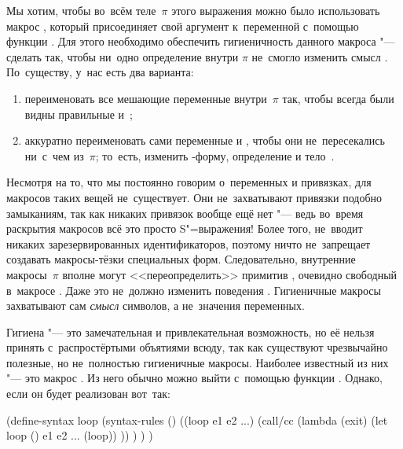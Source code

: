 Мы хотим, чтобы во~всём теле~$\pi$ этого выражения можно было использовать
макрос , который присоединяет свой аргумент к~переменной 
с~помощью функции . Для этого необходимо обеспечить гигиеничность
данного макроса "--- сделать так, чтобы ни~одно определение внутри $\pi$ не~смогло
изменить смысл . По~существу, у~нас есть два варианта:

\begin{enumerate}
  \item переименовать все мешающие переменные внутри~$\pi$ так, чтобы
        всегда были видны правильные  и~;

  \item аккуратно переименовать сами переменные  и ,
        чтобы они не~пересекались ни~с~чем из~$\pi$; то~есть, изменить
        -форму, определение  и тело~.
\end{enumerate}

Несмотря на то, что мы постоянно говорим о~переменных и привязках, для макросов
таких вещей не~существует. Они не~захватывают привязки подобно замыканиям, так
как никаких привязок вообще ещё нет "--- ведь во~время раскрытия макросов всё
это просто S"=выражения! Более того, {\RnRS} не~вводит никаких зарезервированных
идентификаторов, поэтому ничто не~запрещает создавать макросы-тёзки специальных
форм. Следовательно, внутренние макросы~$\pi$ вполне могут <<переопределить>>
примитив , очевидно свободный в~макросе . Даже это не~должно
изменить поведения . Гигиеничные макросы захватывают сам \emph{смысл}
символов, а не~значения переменных.

Гигиена "--- это замечательная и привлекательная возможность, но её нельзя
принять с~распростёртыми объятиями всюду, так как существуют чрезвычайно
полезные, но не~полностью гигиеничные макросы. Наиболее известный из них "---
это макрос . Из него обычно можно выйти с~помощью функции .
Однако, если он будет реализован вот~так:

\begin{code:lisp}
(define-syntax loop
  (syntax-rules ()
    ((loop e1 e2 ...)
     (call/cc (lambda (exit)
                (let loop () e1 e2 ... (loop)) )) ) ) )
\end{code:lisp}

